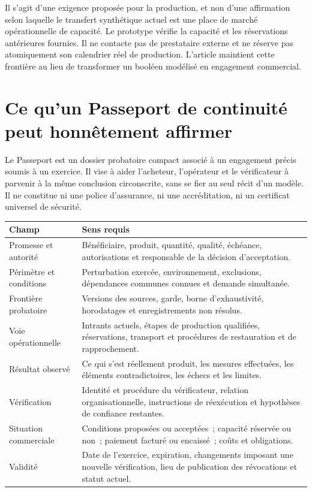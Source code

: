 \documentclass[11pt,a4paper]{article}
\begin{document}
Il s’agit d’une exigence proposée pour la production, et non d’une affirmation selon laquelle le transfert synthétique actuel est une place de marché opérationnelle de capacité. Le prototype vérifie la capacité et les réservations antérieures fournies. Il ne contacte pas de prestataire externe et ne réserve pas atomiquement son calendrier réel de production. L’article maintient cette frontière au lieu de transformer un booléen modélisé en engagement commercial.

\section{Ce qu’un Passeport de continuité peut honnêtement affirmer}\label{sec:passport}
Le Passeport est un dossier probatoire compact associé à un engagement précis soumis à un exercice. Il vise à aider l’acheteur, l’opérateur et le vérificateur à parvenir à la même conclusion circonscrite, sans se fier au seul récit d’un modèle. Il ne constitue ni une police d’assurance, ni une accréditation, ni un certificat universel de sécurité.

\begin{center}\small
\begin{tabularx}{\textwidth}{P{.25\textwidth}Y}
\toprule
\textbf{Champ} & \textbf{Sens requis}\\
\midrule
Promesse et autorité & Bénéficiaire, produit, quantité, qualité, échéance, autorisations et responsable de la décision d’acceptation.\\
Périmètre et conditions & Perturbation exercée, environnement, exclusions, dépendances communes connues et demande simultanée.\\
Frontière probatoire & Versions des sources, garde, borne d’exhaustivité, horodatages et enregistrements non résolus.\\
Voie opérationnelle & Intrants actuels, étapes de production qualifiées, réservations, transport et procédures de restauration et de rapprochement.\\
Résultat observé & Ce qui s’est réellement produit, les mesures effectuées, les éléments contradictoires, les échecs et les limites.\\
Vérification & Identité et procédure du vérificateur, relation organisationnelle, instructions de réexécution et hypothèses de confiance restantes.\\
Situation commerciale & Conditions proposées ou acceptées~; capacité réservée ou non~; paiement facturé ou encaissé~; coûts et obligations.\\
Validité & Date de l’exercice, expiration, changements imposant une nouvelle vérification, lieu de publication des révocations et statut actuel.\\
\bottomrule
\end{tabularx}
\end{center}
\end{document}
